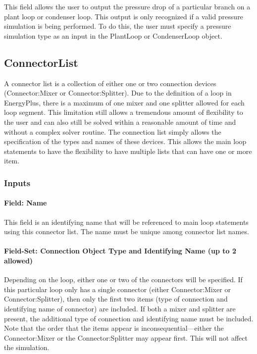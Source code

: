 This field allows the user to output the pressure drop of a particular branch on a plant loop or condenser loop. This output is only recognized if a valid pressure simulation is being performed. To do this, the user must specify a pressure simulation type as an input in the PlantLoop or CondenserLoop object.

\subsection{ConnectorList}\label{connectorlist}

A connector list is a collection of either one or two connection devices (Connector:Mixer or Connector:Splitter). Due to the definition of a loop in EnergyPlus, there is a maximum of one mixer and one splitter allowed for each loop segment. This limitation still allows a tremendous amount of flexibility to the user and can also still be solved within a reasonable amount of time and without a complex solver routine. The connection list simply allows the specification of the types and names of these devices. This allows the main loop statements to have the flexibility to have multiple lists that can have one or more item.

\subsubsection{Inputs}\label{inputs-3-021}

\paragraph{Field: Name}\label{field-name-3-019}

This field is an identifying name that will be referenced to main loop statements using this connector list. The name must be unique among connector list names.

\paragraph{Field-Set: Connection Object Type and Identifying Name (up to 2 allowed)}\label{field-set-connection-object-type-and-identifying-name-up-to-2-allowed}

Depending on the loop, either one or two of the connectors will be specified. If this particular loop only has a single connector (either Connector:Mixer or Connector:Splitter), then only the first two items (type of connection and identifying name of connector) are included. If both a mixer and splitter are present, the additional type of connection and identifying name must be included. Note that the order that the items appear is inconsequential---either the Connector:Mixer or the Connector:Splitter may appear first. This will not affect the simulation.

